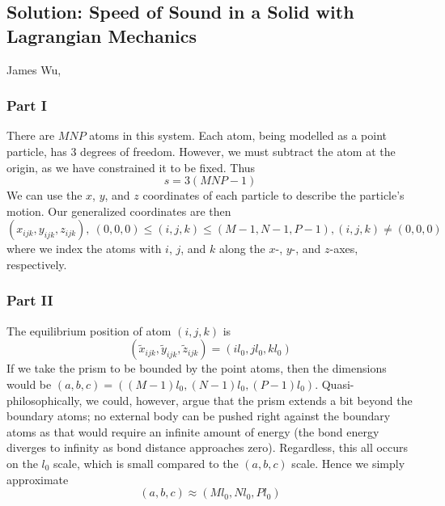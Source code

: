 \documentclass[letterpaper,12pt]{article}
\begin{document}
\begin{center}
    \subsection*{Solution: Speed of Sound in a Solid with Lagrangian Mechanics}
    James Wu, 
\end{center}

\begin{flushleft}

    \subsubsection*{Part I}
    There are $MNP$ atoms in this system. Each atom, being modelled as a point particle, has 3 degrees of freedom. However, we must subtract the atom at the origin, as we have constrained it to be fixed. Thus
    $$\boxed{s = 3(MNP - 1)}$$
    We can use the $x$, $y$, and $z$ coordinates of each particle to describe the particle's motion. Our generalized coordinates are then
    $$\boxed{\left(x_{ijk}, y_{ijk}, z_{ijk}\right), \: (0,0,0) \leq (i,j,k) \leq (M-1, N-1, P-1), (i,j,k) \neq (0,0,0)}$$
    where we index the atoms with $i$, $j$, and $k$ along the $x$-, $y$-, and $z$-axes, respectively.

    \subsubsection*{Part II}
    The equilibrium position of atom $(i,j,k)$ is
    $$\boxed{\left(\tilde{x}_{ijk}, \tilde{y}_{ijk}, \tilde{z}_{ijk}\right) = \left(il_0, jl_0, kl_0\right)}$$
    If we take the prism to be bounded by the point atoms, then the dimensions would be $(a,b,c) = ((M-1)l_0,(N-1)l_0,(P-1)l_0)$. Quasi-philosophically, we could, however, argue that the prism extends a bit beyond the boundary atoms; no external body can be pushed right against the boundary atoms as that would require an infinite amount of energy (the bond energy diverges to infinity as bond distance approaches zero). Regardless, this all occurs on the $l_0$ scale, which is small compared to the $(a,b,c)$ scale. Hence we simply approximate
    $$\boxed{(a,b,c) \approx (Ml_0,Nl_0,Pl_0)}$$


\end{flushleft}
\end{document}
